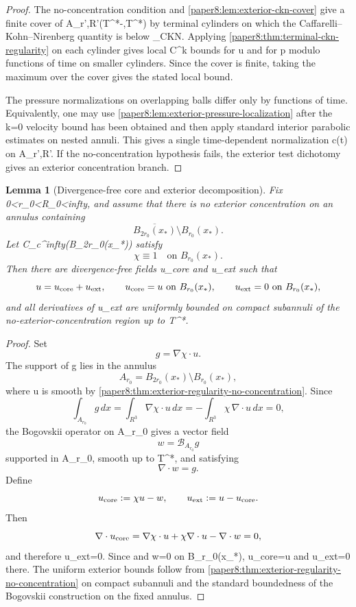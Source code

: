 \documentclass[11pt]{amsart}
\def\({}%
\def\){}%
\def\mathbb#1{#1}%
\def\infty{infty}%
\theoremstyle{plain}
\newtheorem{lemma}[lemma]{Lemma}
\theoremstyle{definition}
\theoremstyle{remark}
\begin{document}
\begin{proof}
The no-concentration condition and \cref{paper8:lem:exterior-ckn-cover} give a
finite cover of \(A_{r',R'}\times(T^*-\delta,T^*)\) by terminal cylinders on
which the Caffarelli--Kohn--Nirenberg quantity is below
\(\varepsilon_{\rm CKN}\).  Applying
\cref{paper8:thm:terminal-ckn-regularity} on each cylinder gives local
\(C^k\) bounds for \(u\) and for \(p\) modulo functions of time on smaller
cylinders.  Since the cover is finite, taking the maximum over the cover gives
the stated local bound.
\par
The pressure normalizations on overlapping balls differ only by functions of
time.  Equivalently, one may use
\cref{paper8:lem:exterior-pressure-localization} after the \(k=0\) velocity
bound has been obtained and then apply standard interior parabolic estimates on
nested annuli.  This gives a single time-dependent normalization \(c(t)\) on
\(A_{r',R'}\).  If the no-concentration hypothesis fails, the exterior test
dichotomy gives an exterior concentration branch.
\end{proof}

\begin{lemma}[Divergence-free core and exterior decomposition]
\label{paper8:lem:core-exterior-decomposition}
Fix \(0<r_0<R_0<\infty\), and assume that there is no exterior concentration
on an annulus containing
\[
  \overline{B_{2r_0}(x_*)}\setminus B_{r_0}(x_*).
\]
Let \(\chi\in C_c^\infty(B_{2r_0}(x_*))\) satisfy
\[
  \chi\equiv1\quad\text{on }B_{r_0}(x_*).
\]
Then there are divergence-free fields \(u_{\rm core}\) and \(u_{\rm ext}\)
such that
\[
  u=u_{\rm core}+u_{\rm ext},\qquad
  u_{\rm core}=u\ \text{on }B_{r_0}(x_*),\qquad
  u_{\rm ext}=0\ \text{on }B_{r_0}(x_*),
\]
and all derivatives of \(u_{\rm ext}\) are uniformly bounded on compact
subannuli of the no-exterior-concentration region up to \(T^*\).
\end{lemma}

\begin{proof}
Set
\[
  g=\nabla\chi\cdot u.
\]
The support of \(g\) lies in the annulus
\[
  A_{r_0}=B_{2r_0}(x_*)\setminus B_{r_0}(x_*),
\]
where \(u\) is smooth by
\cref{paper8:thm:exterior-regularity-no-concentration}.  Since
\[
  \int_{A_{r_0}}g\,dx
  =
  \int_{\mathbb R^3}\nabla\chi\cdot u\,dx
  =
  -\int_{\mathbb R^3}\chi\,\nabla\cdot u\,dx
  =0,
\]
the Bogovskii operator on \(A_{r_0}\) gives a vector field
\[
  w=\mathcal B_{A_{r_0}}g
\]
supported in \(A_{r_0}\), smooth up to \(T^*\), and satisfying
\[
  \nabla\cdot w=g.
\]
Define
\[
  u_{\rm core}:=\chi u-w,
  \qquad
  u_{\rm ext}:=u-u_{\rm core}.
\]
Then
\[
  \nabla\cdot u_{\rm core}
  =
  \nabla\chi\cdot u+\chi\nabla\cdot u-\nabla\cdot w=0,
\]
and therefore \(\nabla\cdot u_{\rm ext}=0\).  Since \(\) and \(w=0\)
on \(B_{r_0}(x_*)\), \(u_{\rm core}=u\) and \(u_{\rm ext}=0\) there.  The
uniform exterior bounds follow from
\cref{paper8:thm:exterior-regularity-no-concentration} on compact subannuli
and the standard boundedness of the Bogovskii construction on the fixed
annulus.
\end{proof}
\end{document}
